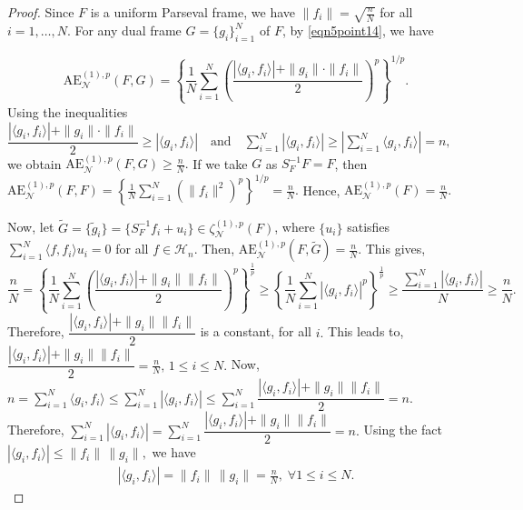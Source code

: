 \documentclass[final,1p,times]{elsarticle}
\begin{document}
\begin{proof}
Since \( F \) is a uniform Parseval frame, we have \( \|f_i\| = \sqrt{\frac{n}{N}} \) for all \( i = 1, \dots, N \). For any dual frame \( G = \{g_i\}_{i=1}^N \) of \( F \), by \eqref{eqn5point14}, we have

\[
\mathrm{AE}_{\mathcal{N}}^{(1),p}(F, G) = \left\{ \frac{1}{N} \sum_{i=1}^N \left( \frac{|\langle g_i, f_i \rangle| + \|g_i\| \cdot \|f_i\|}{2} \right)^p \right\}^{1/p}.
\]
Using the inequalities $\dfrac{|\langle g_i, f_i \rangle| + \|g_i\| \cdot \|f_i\|}{2} \geq |\langle g_i, f_i \rangle| \quad \text{and} \quad \sum_{i=1}^N |\langle g_i, f_i \rangle| \geq \left| \sum_{i=1}^N \langle g_i, f_i \rangle \right| = n,$ we obtain $\mathrm{AE}_{\mathcal{N}}^{(1),p}(F, G) \geq \frac{n}{N}.$ If we take $G$ as $S_{F}^{-1}F= F$, then $\mathrm{AE}_{\mathcal{N}}^{(1),p}(F, F) = \left\{ \frac{1}{N} \sum_{i=1}^N \left( \|f_i\|^2 \right)^p \right\}^{1/p} = \frac{n}{N}. $ Hence, $\mathrm{AE}_{\mathcal{N}}^{(1),p}(F) = \frac{n}{N}.$

Now, let \( \tilde{G} = \{\tilde{g}_i\} = \{S_F^{-1} f_i + u_i\} \in \zeta_{\mathcal{N}}^{(1),p}(F) \), where \( \{u_i\} \) satisfies \( \sum_{i=1}^N \langle f, f_i \rangle u_i = 0 \) for all \( f \in \mathcal{H}_n \). Then, $\mathrm{AE}_{\mathcal{N}}^{(1),p}(F, \tilde{G}) = \frac{n}{N}.$ This gives, 
        $$\frac{n}{N}= \left\{\frac{1}{N} \sum\limits_{i=1}^N\left( \frac{|\langle g_i,f_i\rangle| + \|g_i\|\|f_i\|}{2}\right)^p\right\}^{\frac{1}{p}} \geq \left\{\frac{1}{N} \sum\limits_{i=1}^N|\langle g_i,f_i\rangle|^p\right\}^{\frac{1}{p}} \geq \dfrac{\sum\limits_{i=1}^N|\langle g_i,f_i\rangle|}{N} \geq \dfrac{n}{N}.  $$
       Therefore,  $\dfrac{|\langle g_i,f_i\rangle| + \|g_i\|\|f_i\|}{2}$ is a constant, for all $i.$   This leads to,  $\dfrac{|\langle g_i,f_i\rangle| + \|g_i\|\|f_i\|}{2} = \frac{n}{N},\,1\leq i \leq N.$ Now, $n= \sum\limits_{i=1}^N \langle g_i,f_i \rangle \leq \sum\limits_{i=1}^N \left|\langle g_i,f_i \rangle \right| \leq \sum\limits_{i=1}^N \dfrac{|\langle g_i,f_i\rangle| + \|g_i\|\|f_i\|}{2} = n. $ Therefore, $\sum\limits_{i=1}^N \left|\langle g_i,f_i \rangle \right| = \sum\limits_{i=1}^N \dfrac{|\langle g_i,f_i\rangle| + \|g_i\|\|f_i\|}{2} = n.$ Using the fact $\left|\langle g_i,f_i \rangle \right| \leq \|f_i\|\,\|g_i\|,$ we have 
\begin{align}\label{equation10}
	\left|\langle g_i,f_i \rangle \right| = \|f_i\|\,\|g_i\| = \frac{n}{N} ,\;\forall 1\leq i \leq N.
\end{align}


\end{proof}
\end{document}
